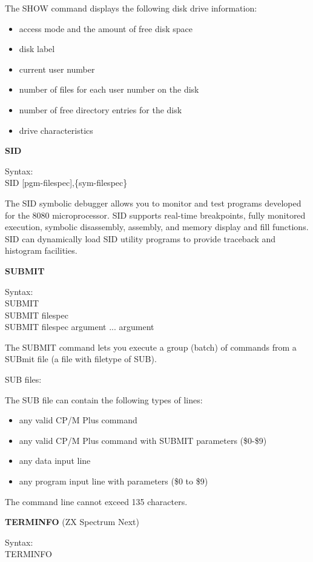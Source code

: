 The SHOW command displays the following disk drive information:
\begin{itemize}
\item access mode and the amount of free disk space
\item disk label
\item current user number
\item number of files for each user number on the disk
\item number of free directory entries for the disk
\item drive characteristics
\end{itemize}

\textbf{SID}

\hangindent=0.7cm Syntax:\\
SID [pgm-filespec],\{sym-filespec\}

The SID symbolic debugger allows you to monitor and test programs
developed for the 8080 microprocessor. SID supports real-time
breakpoints, fully monitored execution, symbolic disassembly,
assembly, and memory display and fill functions. SID can dynamically
load SID utility programs to provide traceback and histogram
facilities.

\textbf{SUBMIT}

\hangindent=0.7cm Syntax:\\
SUBMIT\\
SUBMIT filespec\\
SUBMIT filespec argument ... argument

The SUBMIT command lets you execute a group (batch) of commands from a
SUBmit file (a file with filetype of SUB).

SUB files:

The SUB file can contain the following types of lines:
\begin{itemize}
\item any valid CP/M Plus command
\item any valid CP/M Plus command with SUBMIT parameters (\$0-\$9)
\item any data input line
\item any program input line with parameters (\$0 to \$9)
\end{itemize}

The command line cannot exceed 135 characters.

\textbf{TERMINFO} (ZX Spectrum Next)

\hangindent=0.7cm Syntax:\\
TERMINFO


